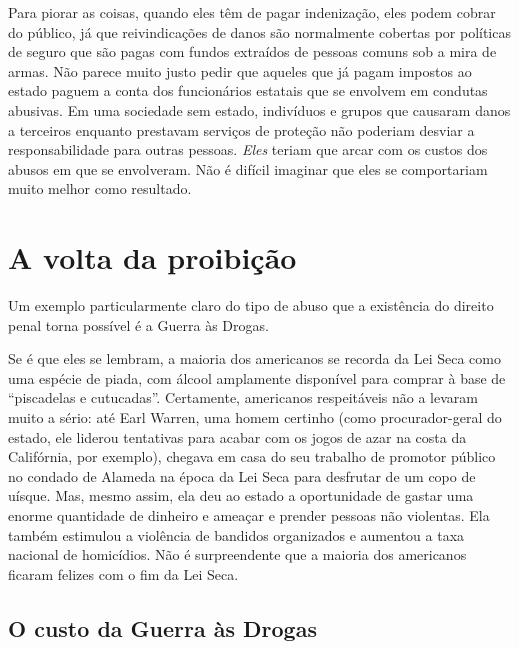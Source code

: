 Para piorar as coisas, quando eles têm de pagar indenização, eles podem cobrar do público, já que reivindicações de danos são normalmente cobertas por políticas de seguro que são pagas com fundos extraídos de pessoas comuns sob a mira de armas. Não parece muito justo pedir que aqueles que já pagam impostos ao estado paguem a conta dos funcionários estatais que se envolvem em condutas abusivas. Em uma sociedade sem estado, indivíduos e grupos que causaram danos a terceiros enquanto prestavam serviços de proteção não poderiam desviar a responsabilidade para outras pessoas. \emph{Eles} teriam que arcar com os custos dos abusos em que se envolveram. Não é difícil imaginar que eles se comportariam muito melhor como resultado.

\section{A volta da proibição}

Um exemplo particularmente claro do tipo de abuso que a existência do direito penal torna possível é a Guerra às Drogas.

Se é que eles se lembram, a maioria dos americanos se recorda da Lei Seca como uma espécie de piada, com álcool amplamente disponível para comprar à base de ``piscadelas e cutucadas''. Certamente, americanos respeitáveis não a levaram muito a sério: até Earl Warren, uma homem certinho (como procurador-geral do estado, ele liderou tentativas para acabar com os jogos de azar na costa da Califórnia, por exemplo), chegava em casa do seu trabalho de promotor público no condado de Alameda na época da Lei Seca para desfrutar de um copo de uísque. Mas, mesmo assim, ela deu ao estado a oportunidade de gastar uma enorme quantidade de dinheiro e ameaçar e prender pessoas não violentas. Ela também estimulou a violência de bandidos organizados e aumentou a taxa nacional de homicídios. Não é surpreendente que a maioria dos americanos ficaram felizes com o fim da Lei Seca.

\subsection*{O custo da Guerra às Drogas}


